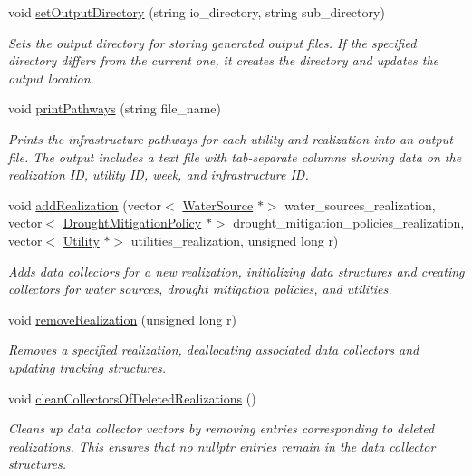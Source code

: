 \begin{DoxyCompactItemize}
void \mbox{\hyperlink{classMasterDataCollector_af597731750248576d43ffc187e48e2a8}{set\+Output\+Directory}} (string io\+\_\+directory, string sub\+\_\+directory)
\begin{DoxyCompactList}\small\item\em Sets the output directory for storing generated output files. If the specified directory differs from the current one, it creates the directory and updates the output location. \end{DoxyCompactList}\item 
void \mbox{\hyperlink{classMasterDataCollector_a966681d5219d11d0c6882522cd2ddd20}{print\+Pathways}} (string file\+\_\+name)
\begin{DoxyCompactList}\small\item\em Prints the infrastructure pathways for each utility and realization into an output file. The output includes a text file with tab-\/separate columns showing data on the realization ID, utility ID, week, and infrastructure ID. \end{DoxyCompactList}\item 
void \mbox{\hyperlink{classMasterDataCollector_aadb319947e62055428b18339d559a0ef}{add\+Realization}} (vector$<$ \mbox{\hyperlink{classWaterSource}{Water\+Source}} $\ast$$>$ water\+\_\+sources\+\_\+realization, vector$<$ \mbox{\hyperlink{classDroughtMitigationPolicy}{Drought\+Mitigation\+Policy}} $\ast$$>$ drought\+\_\+mitigation\+\_\+policies\+\_\+realization, vector$<$ \mbox{\hyperlink{classUtility}{Utility}} $\ast$$>$ utilities\+\_\+realization, unsigned long r)
\begin{DoxyCompactList}\small\item\em Adds data collectors for a new realization, initializing data structures and creating collectors for water sources, drought mitigation policies, and utilities. \end{DoxyCompactList}\item 
void \mbox{\hyperlink{classMasterDataCollector_a5cbae3837d5f32ea3469a55f025692f5}{remove\+Realization}} (unsigned long r)
\begin{DoxyCompactList}\small\item\em Removes a specified realization, deallocating associated data collectors and updating tracking structures. \end{DoxyCompactList}\item 
void \mbox{\hyperlink{classMasterDataCollector_a92683f7c5ec82e45259fe403be285149}{clean\+Collectors\+Of\+Deleted\+Realizations}} ()
\begin{DoxyCompactList}\small\item\em Cleans up data collector vectors by removing entries corresponding to deleted realizations. This ensures that no {\ttfamily nullptr} entries remain in the data collector structures. \end{DoxyCompactList}\item 
$$
\end{DoxyCompactItemize}

